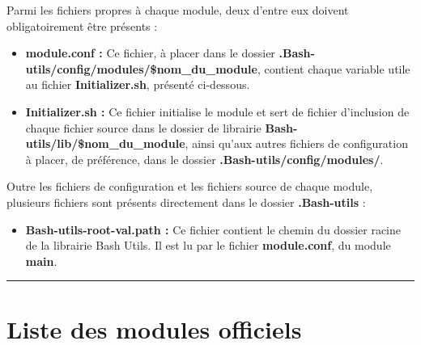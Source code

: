 \documentclass[a4paper,10pt]{article}
\begin{document}
    \begin{justify}
        Parmi les fichiers propres à chaque module, deux d'entre eux doivent obligatoirement être présents :

        \begin{itemize}
            \item \textbf{\color{path}module.conf\color{text} :} Ce fichier, à placer dans le dossier \textbf{\color{path}.Bash-utils/config/modules/\$nom\_du\_module}, contient chaque variable utile au fichier \textbf{\color{path}Initializer.sh}, présenté ci-dessous.\\\mbox{}

            \item \textbf{\color{path}Initializer.sh\color{text} :} Ce fichier initialise le module et sert de fichier d'inclusion de chaque fichier source dans le dossier de librairie \textbf{\color{path}Bash-utils/lib/\$nom\_du\_module}, ainsi qu'aux autres fichiers de configuration à placer, de préférence, dans le dossier \textbf{\color{path}.Bash-utils/config/modules/}.
        \end{itemize}
    \end{justify}

    \begin{justify}
        Outre les fichiers de configuration et les fichiers source de chaque module, plusieurs fichiers sont présents directement dans le dossier \textbf{\color{path}.Bash-utils} :

        \begin{itemize}
            \item \textbf{\color{path}Bash-utils-root-val.path\color{text} :} Ce fichier contient le chemin du dossier racine de la librairie Bash Utils. Il est lu par le fichier \textbf{\color{path}module.conf}, du module \color{path}\textbf{main}.
        \end{itemize}
    \end{justify}





    \color{sec1}\par\noindent\rule{\textwidth}{0.4pt}\color{text}

    \color{sec1}
    \section{Liste des modules officiels}\color{text}
\end{document}
